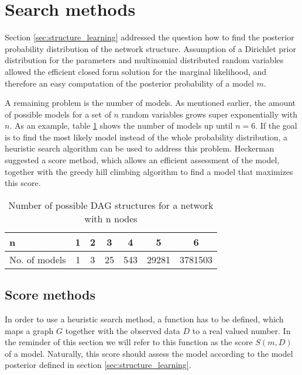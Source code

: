 \documentclass{article}
\begin{document}
\section{Search methods}
	Section \ref{sec:structure_learning} addressed the question how to find the posterior probability distribution of the
	network structure. Assumption of a Dirichlet prior distribution for the parameters
	and multinomial distributed random variables allowed the
	efficient closed form solution for the marginal likelihood, and therefore an easy computation
	of the posterior probability of a model $m$.
	
	A remaining problem is the number of models. As mentioned earlier, the amount of possible
	models for a set of $n$ random	variables grows super exponentially with $n$. As an example,
	table \ref{tab:number_dag} shows the number of models up until $n=6$. If the goal is to find the
	most likely model instead of the whole probability distribution, a heuristic search algorithm
	can be used to address this problem.
	Heckerman suggested a score method, which allows an efficient assessment of the
	model, together with the greedy hill climbing algorithm to find a model that
	maximizes this score.
	
	\begin{table}[t]
	\caption{Number of possible DAG structures for a network with n nodes}
	\label{tab:number_dag}
	\begin{center}
		\begin{small}
			\begin{sc}
				\begin{tabular}{l|c|c|c|c|c|c}
					\hline
					\abovespace
					\belowspace
					n & 1 & 2 & 3 & 4 & 5 & 6\\
					\hline
					\abovespace
					\belowspace
					No. of models & 1 & 3 & 25 & 543 & 29281 & 3781503\\
					\hline
				\end{tabular}
			\end{sc}
		\end{small}
	\end{center}
	\vskip 0.1in
	\end{table}
	
	\subsection{Score methods}
	In order to use a heuristic search method, a function has to be defined,
	which maps a graph $G$	together with the observed data $D$ to a real valued number. 
	In the reminder of this section we will refer to this function as the score $S(m,D)$
	of a model. Naturally, this score should assess the model according to the model posterior defined
	in section \ref{sec:structure_learning}. 
	
\end{document}
